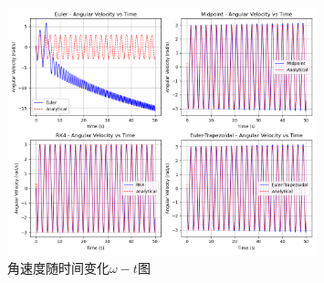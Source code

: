 \begin{figure}[H]
    \centering
    \includegraphics[width=0.8\textwidth]{Problem_1/figs/angle_velocity_time.png}
    \caption{角速度随时间变化$\omega - t $图}
\end{figure}

